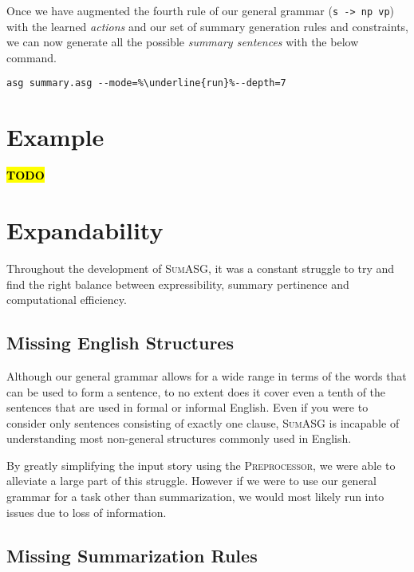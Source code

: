 Once we have augmented the fourth rule of our general grammar (\texttt{s -> np vp}) with the learned \textit{actions} and our set of summary generation rules and constraints, we can now generate all the possible \textit{summary sentences} with the below command.

\begin{displayquote}
\begin{lstlisting}[numbers=none, escapechar=\%]
asg summary.asg --mode=%\underline{run}%--depth=7
\end{lstlisting}
\end{displayquote}

\section{Example}

\textcolor{red}{\textbf{\hl{TODO}}}

\section{Expandability}

Throughout the development of \textsc{SumASG}, it was a constant struggle to try and find the right balance between expressibility, summary pertinence and computational efficiency.

\subsection{Missing English Structures}

Although our general grammar allows for a wide range in terms of the words that can be used to form a sentence, to no extent does it cover even a tenth of the sentences that are used in formal or informal English. Even if you were to consider only sentences consisting of exactly one clause, \textsc{SumASG} is incapable of understanding most non-general structures commonly used in English.

By greatly simplifying the input story using the \textsc{Preprocessor}, we were able to alleviate a large part of this struggle. However if we were to use our general grammar for a task other than summarization, we would most likely run into issues due to loss of information.

\subsection{Missing Summarization Rules}

